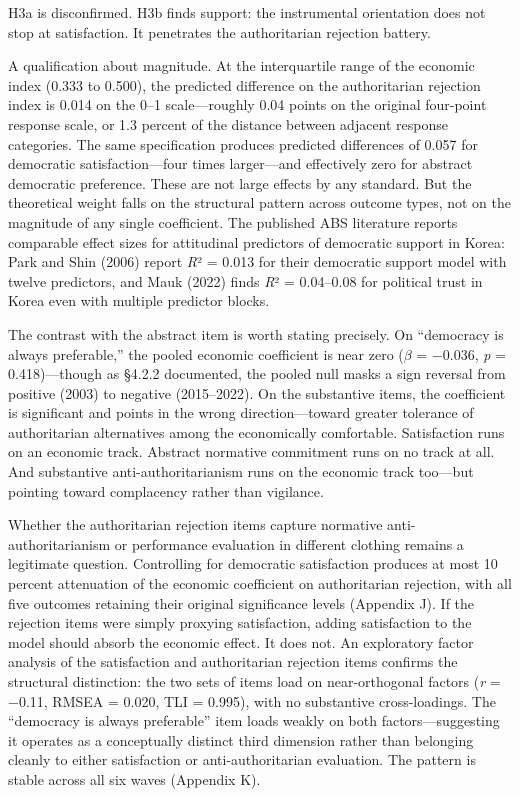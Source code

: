 \documentclass[
  12pt,
  12pt,
  letterpaper]{article}
\begin{document}
H3a is disconfirmed. H3b finds support: the instrumental orientation
does not stop at satisfaction. It penetrates the authoritarian rejection
battery.

A qualification about magnitude. At the interquartile range of the
economic index (0.333 to 0.500), the predicted difference on the
authoritarian rejection index is 0.014 on the 0--1 scale---roughly 0.04
points on the original four-point response scale, or 1.3 percent of the
distance between adjacent response categories. The same specification
produces predicted differences of 0.057 for democratic
satisfaction---four times larger---and effectively zero for abstract
democratic preference. These are not large effects by any standard. But
the theoretical weight falls on the structural pattern across outcome
types, not on the magnitude of any single coefficient. The published ABS
literature reports comparable effect sizes for attitudinal predictors of
democratic support in Korea: Park and Shin (2006) report \emph{R}² =
0.013 for their democratic support model with twelve predictors, and
Mauk (2022) finds \emph{R}² = 0.04--0.08 for political trust in Korea
even with multiple predictor blocks.

The contrast with the abstract item is worth stating precisely. On
``democracy is always preferable,'' the pooled economic coefficient is
near zero (\(\beta\) = −0.036, \emph{p} = 0.418)---though as §4.2.2
documented, the pooled null masks a sign reversal from positive (2003)
to negative (2015--2022). On the substantive items, the coefficient is
significant and points in the wrong direction---toward greater tolerance
of authoritarian alternatives among the economically comfortable.
Satisfaction runs on an economic track. Abstract normative commitment
runs on no track at all. And substantive anti-authoritarianism runs on
the economic track too---but pointing toward complacency rather than
vigilance.

Whether the authoritarian rejection items capture normative
anti-authoritarianism or performance evaluation in different clothing
remains a legitimate question. Controlling for democratic satisfaction
produces at most 10 percent attenuation of the economic coefficient on
authoritarian rejection, with all five outcomes retaining their original
significance levels (Appendix J). If the rejection items were simply
proxying satisfaction, adding satisfaction to the model should absorb
the economic effect. It does not. An exploratory factor analysis of the
satisfaction and authoritarian rejection items confirms the structural
distinction: the two sets of items load on near-orthogonal factors
(\emph{r} = −0.11, RMSEA = 0.020, TLI = 0.995), with no substantive
cross-loadings. The ``democracy is always preferable'' item loads weakly
on both factors---suggesting it operates as a conceptually distinct
third dimension rather than belonging cleanly to either satisfaction or
anti-authoritarian evaluation. The pattern is stable across all six
waves (Appendix K).
\end{document}
